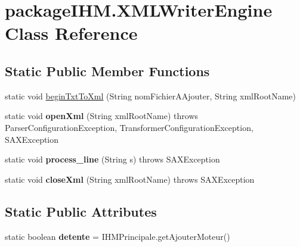 \hypertarget{classpackage_i_h_m_1_1_x_m_l_writer_engine}{}\section{package\+I\+H\+M.\+X\+M\+L\+Writer\+Engine Class Reference}
\label{classpackage_i_h_m_1_1_x_m_l_writer_engine}
\subsection*{Static Public Member Functions}
\begin{DoxyCompactItemize}
\item 
static void \mbox{\hyperlink{classpackage_i_h_m_1_1_x_m_l_writer_engine_a034600829c2639024d05ca1f8817548d}{begin\+Txt\+To\+Xml}} (String nom\+Fichier\+A\+Ajouter, String xml\+Root\+Name)
\item 
\mbox{\label{classpackage_i_h_m_1_1_x_m_l_writer_engine_a232a93b9139813d46e3124712864054d}} 
static void {\bfseries open\+Xml} (String xml\+Root\+Name)  throws Parser\+Configuration\+Exception, Transformer\+Configuration\+Exception, S\+A\+X\+Exception 
\item 
\mbox{\label{classpackage_i_h_m_1_1_x_m_l_writer_engine_ac18b22451d5382bfd52862c7c409334d}} 
static void {\bfseries process\+\_\+line} (String s)  throws S\+A\+X\+Exception 
\item 
\mbox{\label{classpackage_i_h_m_1_1_x_m_l_writer_engine_a7f0d2ba3ee92e5dd2297f7b4c37eb756}} 
static void {\bfseries close\+Xml} (String xml\+Root\+Name)  throws S\+A\+X\+Exception 
\end{DoxyCompactItemize}
\subsection*{Static Public Attributes}
\begin{DoxyCompactItemize}
\item 
\mbox{\label{classpackage_i_h_m_1_1_x_m_l_writer_engine_a085cb96009b631ffd6a02feb519edb17}} 
static boolean {\bfseries detente} = I\+H\+M\+Principale.\+get\+Ajouter\+Moteur()
\end{DoxyCompactItemize}


